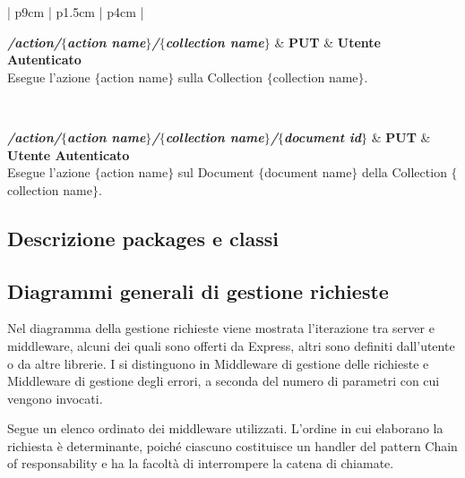 \begin{center}
\begin{longtable}{| p{9cm} | p{1.5cm} | p{4cm} |}
	 {} \\ \hline
	
	\textbf{\emph{/action/$\{$action name$\}$/$\{$collection name$\}$}} & \textbf{PUT} & \textbf{Utente Autenticato} \\ \hline
	 {Esegue l'azione $\{$action name$\}$ sulla Collection $\{$collection name$\}$.}  \\ 
	\specialrule{1pt}{1pt}{1pt}
	
	 {} \\ \hline
	
	\textbf{\emph{/action/$\{$action name$\}$/$\{$collection name$\}$/$\{$document id$\}$}} & \textbf{PUT} & \textbf{Utente Autenticato} \\ \hline
	 {Esegue l'azione $\{$action name$\}$ sul Document $\{$document name$\}$ della Collection 
	$\{$collection name$\}$.}  \\ 
	\specialrule{1pt}{1pt}{1pt}

	
\end{longtable}
	  \egroup
\end{center}

\subsection{Descrizione packages e classi}

%

\subsection{Diagrammi generali di gestione richieste}
Nel diagramma della gestione richieste viene mostrata l'iterazione tra server e middleware, alcuni dei quali sono offerti da Express, altri sono definiti dall'utente o da altre librerie. I  si distinguono in Middleware di gestione delle richieste e Middleware di gestione degli errori, a seconda del numero di parametri con cui vengono invocati.

Segue un elenco ordinato dei middleware utilizzati. L'ordine in cui elaborano la richiesta è determinante, poiché ciascuno costituisce un handler del pattern Chain of responsability e ha la facoltà di interrompere la catena di chiamate.

